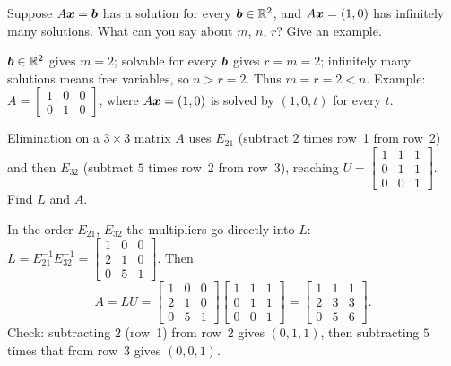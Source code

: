 \begin{exercise}\label{ex:u15-v1}
Suppose $A\boldsymbol{x}=\boldsymbol{b}$ has a solution for every $\boldsymbol{b}\in\mathbb{R}^2$, and $A\boldsymbol{x}=(1,0)$ has
infinitely many solutions. What can you say about $m$, $n$, $r$? Give an example.
\end{exercise}

\begin{solution}
$\boldsymbol{b}\in\mathbb{R}^2$ gives $m=2$; solvable for every $\boldsymbol{b}$ gives $r=m=2$; infinitely many
solutions means free variables, so $n>r=2$. Thus $m=r=2<n$. Example:
$A=\begin{bmatrix}1&0&0\\0&1&0\end{bmatrix}$, where $A\boldsymbol{x}=(1,0)$ is solved by
$(1,0,t)$ for every $t$.
\end{solution}

\begin{exercise}\label{ex:u15-v2}
Elimination on a $3\times 3$ matrix $A$ uses $E_{21}$ (subtract $2$ times row~1 from
row~2) and then $E_{32}$ (subtract $5$ times row~2 from row~3), reaching
$U=\begin{bmatrix}1&1&1\\0&1&1\\0&0&1\end{bmatrix}$. Find $L$ and $A$.
\end{exercise}

\begin{solution}
In the order $E_{21}$, $E_{32}$ the multipliers go directly into $L$:
$L=E_{21}^{-1}E_{32}^{-1}=\begin{bmatrix}1&0&0\\2&1&0\\0&5&1\end{bmatrix}$. Then
\[
  A=LU=\begin{bmatrix}1&0&0\\2&1&0\\0&5&1\end{bmatrix}
       \begin{bmatrix}1&1&1\\0&1&1\\0&0&1\end{bmatrix}
      =\begin{bmatrix}1&1&1\\2&3&3\\0&5&6\end{bmatrix}.
\]
Check: subtracting $2$ (row~1) from row~2 gives $(0,1,1)$, then subtracting $5$ times that
from row~3 gives $(0,0,1)$.
\end{solution}
